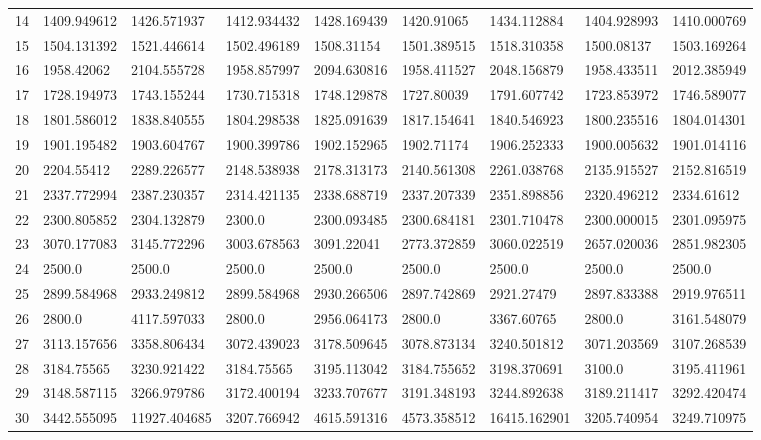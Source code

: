 \begin{table*}[!t]
\begin{tabular}{|p{0.8cm}|p{1.6cm}|p{1.6cm}|p{1.6cm}|p{1.6cm}|p{1.6cm}|p{1.6cm}|p{1.6cm}|p{1.6cm}|}
14  & 1409.949612 & 1426.571937 & 1412.934432 & 1428.169439 & 1420.91065 & 1434.112884 & 1404.928993 & 1410.000769 \\ 
15  & 1504.131392 & 1521.446614 & 1502.496189 & 1508.31154 & 1501.389515 & 1518.310358 & 1500.08137 & 1503.169264 \\ 
16  & 1958.42062 & 2104.555728 & 1958.857997 & 2094.630816 & 1958.411527 & 2048.156879 & 1958.433511 & 2012.385949 \\ 
17  & 1728.194973 & 1743.155244 & 1730.715318 & 1748.129878 & 1727.80039 & 1791.607742 & 1723.853972 & 1746.589077 \\ 
18  & 1801.586012 & 1838.840555 & 1804.298538 & 1825.091639 & 1817.154641 & 1840.546923 & 1800.235516 & 1804.014301 \\ 
19  & 1901.195482 & 1903.604767 & 1900.399786 & 1902.152965 & 1902.71174 & 1906.252333 & 1900.005632 & 1901.014116 \\ 
20  & 2204.55412 & 2289.226577 & 2148.538938 & 2178.313173 & 2140.561308 & 2261.038768 & 2135.915527 & 2152.816519 \\ 
21  & 2337.772994 & 2387.230357 & 2314.421135 & 2338.688719 & 2337.207339 & 2351.898856 & 2320.496212 & 2334.61612 \\ 
22  & 2300.805852 & 2304.132879 & 2300.0 & 2300.093485 & 2300.684181 & 2301.710478 & 2300.000015 & 2301.095975 \\ 
23  & 3070.177083 & 3145.772296 & 3003.678563 & 3091.22041 & 2773.372859 & 3060.022519 & 2657.020036 & 2851.982305 \\ 
24  & 2500.0 & 2500.0 & 2500.0 & 2500.0 & 2500.0 & 2500.0 & 2500.0 & 2500.0 \\ 
25  & 2899.584968 & 2933.249812 & 2899.584968 & 2930.266506 & 2897.742869 & 2921.27479 & 2897.833388 & 2919.976511 \\ 
26  & 2800.0 & 4117.597033 & 2800.0 & 2956.064173 & 2800.0 & 3367.60765 & 2800.0 & 3161.548079 \\ 
27  & 3113.157656 & 3358.806434 & 3072.439023 & 3178.509645 & 3078.873134 & 3240.501812 & 3071.203569 & 3107.268539 \\ 
28  & 3184.75565 & 3230.921422 & 3184.75565 & 3195.113042 & 3184.755652 & 3198.370691 & 3100.0 & 3195.411961 \\ 
29  & 3148.587115 & 3266.979786 & 3172.400194 & 3233.707677 & 3191.348193 & 3244.892638 & 3189.211417 & 3292.420474 \\ 
30  & 3442.555095 & 11927.404685 & 3207.766942 & 4615.591316 & 4573.358512 & 16415.162901 & 3205.740954 & 3249.710975 \\
\hline

\end{tabular}
\end{table*}

